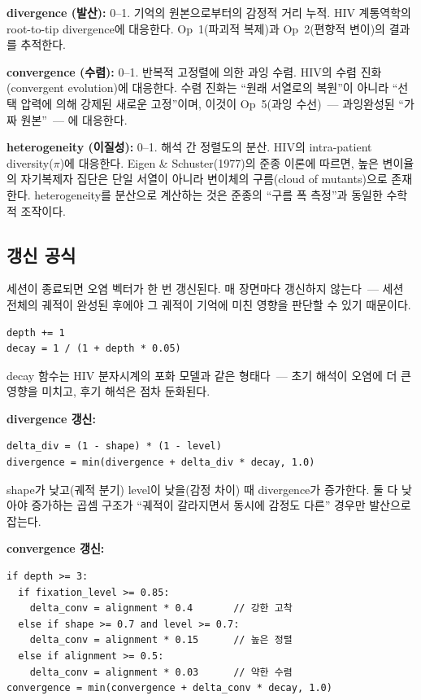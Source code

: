 \documentclass[11pt, a4paper]{article}
\begin{document}
\textbf{divergence (발산):} 0--1. 기억의 원본으로부터의 감정적 거리 누적. HIV 계통역학의 root-to-tip divergence에 대응한다. Op~1(파괴적 복제)과 Op~2(편향적 변이)의 결과를 추적한다.

\textbf{convergence (수렴):} 0--1. 반복적 고정렬에 의한 과잉 수렴. HIV의 수렴 진화(convergent evolution)에 대응한다. 수렴 진화는 ``원래 서열로의 복원''이 아니라 ``선택 압력에 의해 강제된 새로운 고정''이며, 이것이 Op~5(과잉 수선)~--- 과잉완성된 ``가짜 원본''~--- 에 대응한다.

\textbf{heterogeneity (이질성):} 0--1. 해석 간 정렬도의 분산. HIV의 intra-patient diversity($\pi$)에 대응한다. Eigen \& Schuster(1977)의 준종 이론\cite{eigen1977}에 따르면, 높은 변이율의 자기복제자 집단은 단일 서열이 아니라 변이체의 구름(cloud of mutants)으로 존재한다. heterogeneity를 분산으로 계산하는 것은 준종의 ``구름 폭 측정''과 동일한 수학적 조작이다.

\subsection{갱신 공식}

세션이 종료되면 오염 벡터가 한 번 갱신된다. 매 장면마다 갱신하지 않는다~--- 세션 전체의 궤적이 완성된 후에야 그 궤적이 기억에 미친 영향을 판단할 수 있기 때문이다.

\begin{lstlisting}
depth += 1
decay = 1 / (1 + depth * 0.05)
\end{lstlisting}

decay 함수는 HIV 분자시계의 포화 모델과 같은 형태다~--- 초기 해석이 오염에 더 큰 영향을 미치고, 후기 해석은 점차 둔화된다.

\textbf{divergence 갱신:}
\begin{lstlisting}
delta_div = (1 - shape) * (1 - level)
divergence = min(divergence + delta_div * decay, 1.0)
\end{lstlisting}

shape가 낮고(궤적 분기) level이 낮을(감정 차이) 때 divergence가 증가한다. 둘 다 낮아야 증가하는 곱셈 구조가 ``궤적이 갈라지면서 동시에 감정도 다른'' 경우만 발산으로 잡는다.

\textbf{convergence 갱신:}
\begin{lstlisting}
if depth >= 3:
  if fixation_level >= 0.85:
    delta_conv = alignment * 0.4       // 강한 고착
  else if shape >= 0.7 and level >= 0.7:
    delta_conv = alignment * 0.15      // 높은 정렬
  else if alignment >= 0.5:
    delta_conv = alignment * 0.03      // 약한 수렴
convergence = min(convergence + delta_conv * decay, 1.0)
\end{lstlisting}
\end{document}
